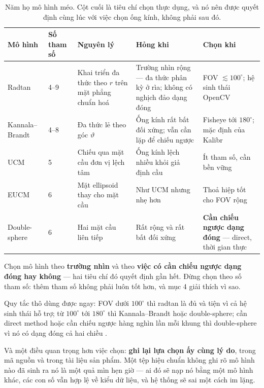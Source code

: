 \documentclass[../../vslam.tex]{subfiles}
\begin{document}
\begin{table}[H]\centering\small
\caption{Năm họ mô hình méo. Cột cuối là tiêu chí chọn thực dụng, và nó nên được quyết định cùng lúc với việc chọn ống kính, không phải sau đó.}
\label{tab:a02-models}
\begin{tabularx}{\linewidth}{@{}L{2.3cm}L{1.1cm}L{3.2cm}YL{2.5cm}@{}}
\toprule
\textbf{Mô hình} & \textbf{Số tham số} & \textbf{Nguyên lý} & \textbf{Hỏng khi} & \textbf{Chọn khi}\\
\midrule
Radtan & 4--9 & Khai triển đa thức theo \(r\) trên mặt phẳng chuẩn hoá & Trường nhìn rộng --- đa thức phân kỳ ở rìa; không có nghịch đảo dạng đóng & FOV \(\lesssim 100^\circ\); hệ sinh thái OpenCV\\
Kannala--Brandt & 4--8 & Đa thức lẻ theo góc \(\vartheta\) & Ống kính rất bất đối xứng; vẫn cần lặp để chiếu ngược & Fisheye tới \(180^\circ\); mặc định của Kalibr\\
UCM & 5 & Chiếu qua mặt cầu đơn vị lệch tâm & Ống kính lệch nhiều khỏi giả định cầu & Ít tham số, cần bền vững\\
EUCM & 6 & Mặt ellipsoid thay cho mặt cầu & Như UCM nhưng nhẹ hơn & Thoả hiệp tốt cho FOV rộng\\
Double-sphere & 6 & Hai mặt cầu liên tiếp & Rất rộng và rất bất đối xứng & \textbf{Cần chiếu ngược dạng đóng} --- direct, thời gian thực\\
\bottomrule
\end{tabularx}
\end{table}

\begin{cannho}
Chọn mô hình theo \textbf{trường nhìn} và theo \textbf{việc có cần chiếu ngược dạng đóng hay không} --- hai tiêu chí đó quyết định gần hết. Đừng chọn theo số tham số: thêm tham số không phải luôn tốt hơn, và mục 4 giải thích vì sao.

Quy tắc thô dùng được ngay: FOV dưới \(100^\circ\) thì radtan là đủ và tiện vì cả hệ sinh thái hỗ trợ; từ \(100^\circ\) tới \(180^\circ\) thì Kannala--Brandt hoặc double-sphere; cần direct method hoặc cần chiếu ngược hàng nghìn lần mỗi khung thì double-sphere vì nó có dạng đóng cả hai chiều \cite{usenko2018doublesphere}.

Và một điều quan trọng hơn việc chọn: \textbf{ghi lại lựa chọn ấy cùng lý do}, trong mã nguồn và trong tài liệu sản phẩm. Một tệp hiệu chuẩn không ghi rõ mô hình nào đã sinh ra nó là một quả mìn hẹn giờ --- ai đó sẽ nạp nó bằng một mô hình khác, các con số vẫn hợp lệ về kiểu dữ liệu, và hệ thống sẽ sai một cách im lặng.
\end{cannho}
\end{document}

